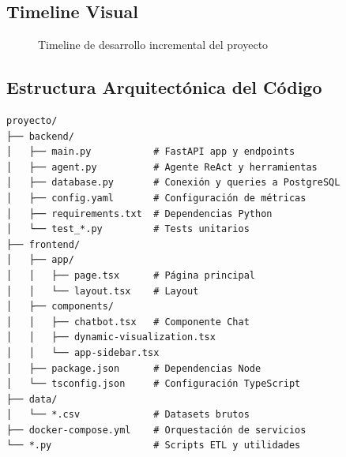 \documentclass[11pt, a4paper]{report}
\begin{document}
\subsection{Timeline Visual}

\begin{figure}[H]
\centering
{}
\caption{Timeline de desarrollo incremental del proyecto}
\label{fig:timeline}
\end{figure}

\subsection{Estructura Arquitectónica del Código}

\begin{lstlisting}[caption=Estructura de carpetas principales]
proyecto/
├── backend/
│   ├── main.py           # FastAPI app y endpoints
│   ├── agent.py          # Agente ReAct y herramientas
│   ├── database.py       # Conexión y queries a PostgreSQL
│   ├── config.yaml       # Configuración de métricas
│   ├── requirements.txt  # Dependencias Python
│   └── test_*.py         # Tests unitarios
├── frontend/
│   ├── app/
│   │   ├── page.tsx      # Página principal
│   │   └── layout.tsx    # Layout
│   ├── components/
│   │   ├── chatbot.tsx   # Componente Chat
│   │   ├── dynamic-visualization.tsx
│   │   └── app-sidebar.tsx
│   ├── package.json      # Dependencias Node
│   └── tsconfig.json     # Configuración TypeScript
├── data/
│   └── *.csv             # Datasets brutos
├── docker-compose.yml    # Orquestación de servicios
└── *.py                  # Scripts ETL y utilidades
\end{lstlisting}
\end{document}
